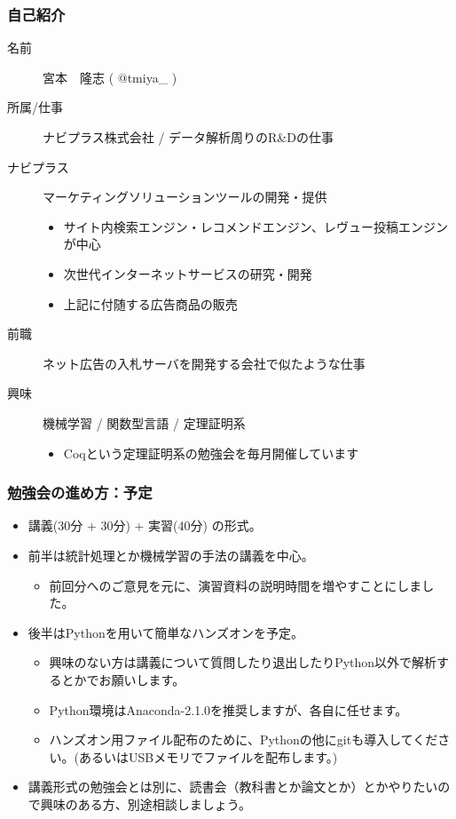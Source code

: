 \documentclass{beamer}
\begin{document}
\begin{frame}[containsverbatim]
  \frametitle{自己紹介}
  \begin{description}
    \item[名前] 宮本　隆志 ( @tmiya\_ )
    \item[所属/仕事] ナビプラス株式会社 / データ解析周りのR\&Dの仕事
    \item[ナビプラス] マーケティングソリューションツールの開発・提供
    \begin{itemize}
      \item サイト内検索エンジン・レコメンドエンジン、レヴュー投稿エンジンが中心
      \item 次世代インターネットサービスの研究・開発
      \item 上記に付随する広告商品の販売
    \end{itemize}
    \item[前職] ネット広告の入札サーバを開発する会社で似たような仕事
    \item[興味] 機械学習 / 関数型言語 / 定理証明系
    \begin{itemize}
      \item Coqという定理証明系の勉強会を毎月開催しています
    \end{itemize}
  \end{description}
\end{frame}
\begin{frame}
  \frametitle{勉強会の進め方：予定}
  \begin{itemize}
    \item 講義(30分 + 30分) + 実習(40分) の形式。
    \item 前半は統計処理とか機械学習の手法の講義を中心。
    \begin{itemize}
      \item 前回分へのご意見を元に、演習資料の説明時間を増やすことにしました。
    \end{itemize}
    \item 後半はPythonを用いて簡単なハンズオンを予定。
    \begin{itemize}
      \item 興味のない方は講義について質問したり退出したりPython以外で解析するとかでお願いします。
      \item Python環境はAnaconda-2.1.0を推奨しますが、各自に任せます。
      \item ハンズオン用ファイル配布のために、Pythonの他にgitも導入してください。(あるいはUSBメモリでファイルを配布します。)
    \end{itemize}
    \item 講義形式の勉強会とは別に、読書会（教科書とか論文とか）とかやりたいので興味のある方、別途相談しましょう。
  \end{itemize}
\end{frame}
\end{document}
